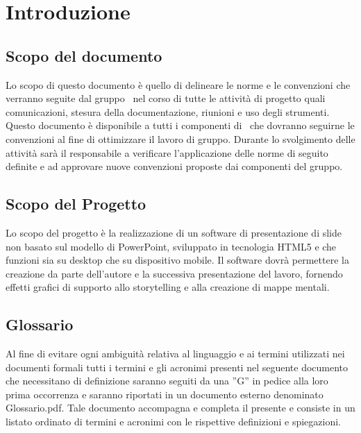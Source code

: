 \section{Introduzione}
\subsection{Scopo del documento}
Lo scopo di questo documento è quello di delineare le norme e le convenzioni che verranno
seguite dal gruppo \gruppo\ nel corso di tutte le attività di progetto quali comunicazioni, stesura
della documentazione, riunioni e uso degli strumenti.
Questo documento è disponibile a tutti i componenti di \gruppo\ che dovranno seguirne le
convenzioni al fine di ottimizzare il lavoro di gruppo.
Durante lo svolgimento delle attività sarà il responsabile a verificare l’applicazione delle norme
di seguito definite e ad approvare nuove convenzioni proposte dai componenti del gruppo.

\subsection{Scopo del Progetto}
Lo scopo del progetto è la realizzazione di un software di presentazione di slide non basato sul modello di PowerPoint, sviluppato in tecnologia HTML5 e che funzioni sia su desktop che su dispositivo mobile. Il software dovrà permettere la creazione da parte dell'autore e la successiva presentazione del lavoro, fornendo effetti grafici di supporto allo storytelling e alla creazione di mappe mentali. 

\subsection{Glossario}

Al fine di evitare ogni ambiguità relativa al linguaggio e ai termini utilizzati nei documenti formali tutti i termini e gli acronimi presenti nel seguente documento che necessitano di definizione saranno seguiti da una ”G” in pedice alla loro prima occorrenza e saranno riportati in un documento esterno denominato Glossario.pdf. Tale documento accompagna e completa il presente e consiste in un listato ordinato di termini e acronimi con le rispettive definizioni e spiegazioni.

\newpage